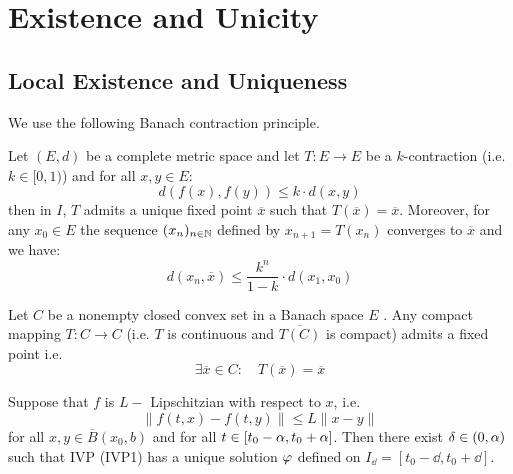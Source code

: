 \section{Existence and Unicity}
\subsection{Local Existence and Uniqueness}
We use the following Banach contraction principle.
\begin{theorem}[]
Let $(E, d)  $  be a complete metric space and let $ T : E \longrightarrow E $ be a 
$k $-contraction (i.e. $k \in [0, 1) $) and for all 
$x,y \in  E $: 
\[
d(f(x) , f(y) )  \leq  k \cdot  d(x, y) 
\]
then in $I $, $T$ admits a unique fixed point $\overline{x}$ such that $T(\overline{x}) = \overline{x}  $. Moreover,
for any $x_0 \in  E $ the sequence 
$(x_n )_{n \in  \mathbb{N}}  $ defined by $x_{n+1} = T(x_n )  $ converges to $\overline{x} $ and we have: 
\[
d(x_n , \overline{x})  \leq 
\frac{k^{n}}{1-k} \cdot d(x_1, x_0) 
\]
\end{theorem}
\begin{theorem}[Schauder]
Let $C $ be a nonempty closed convex set in a Banach space $E $ . 
Any compact mapping $ T : C \longrightarrow C $
(i.e. $T $ is continuous and $\overline{T(C) } $ is compact) admits a fixed point 
i.e. 
\[
\exists \overline{x}\in   C: \quad T(\overline{x})  = \overline{x}
\]
\end{theorem}
\begin{theorem}[]
Suppose that $f $ is $L- $ Lipschitzian with respect to $x $, i.e. 
\[
  \| f(t,x) - f(t, y)  \| \leq  L \| x-y \| 
\]
for all $x, y \in  \overline{B}(x_0, b) $ and for all $t \in  \left[ t_0 - \alpha, t_0 + \alpha \right] $. Then 
there exist $\delta  \in   (0, \alpha)  $ such that IVP (IVP1) has a unique solution $\varphi  $ defined on 
$I_{\dd } = \left[ t_0 - \dd , t_0 + \dd  \right]$.
\end{theorem}
